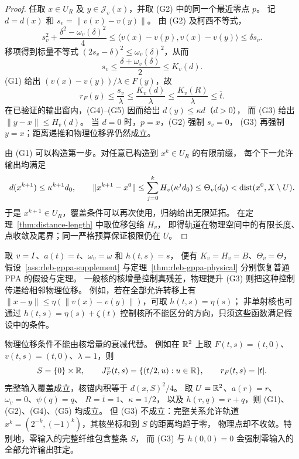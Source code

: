 \begin{proof}
任取 $x\in U_R$ 及 $y\in\mathcal J_v(x)$，并取 (G2) 中的同一个最近零点 $p$。
记 $d=d(x)$ 和 $s_v=\|v(x)-v(y)\|$。
由 (G2) 及柯西不等式，
\[
 s_v^2+\frac{\delta^2-\omega_v(\delta)^2}{4}
 \le\langle v(x)-v(p),v(x)-v(y)\rangle
 \le\delta s_v.
\]
移项得到标量不等式 $(2s_v-\delta)^2\le\omega_v(\delta)^2$，从而
\begin{equation}
\label{eq:gppa-kernel-one-step}
 s_v\le\frac{\delta+\omega_v(\delta)}2\le K_v(d).
\end{equation}
(G1) 给出 $(v(x)-v(y))/\lambda\in F(y)$，故
\[
 r_F(y)\le\frac{s_v}\lambda
 \le\frac{K_v(d)}\lambda\le\frac{K_v(R)}\lambda\le\bar t.
\]
在已验证的输出窗内，(G4)--(G5) 因而给出 $d(y)\le\kappa d$（$d>0$），
而 (G3) 给出 $\|y-x\|\le H_v(d)$。
当 $d=0$ 时，$p=x$，(G2) 强制 $s_v=0$，
(G3) 再强制 $y=x$；距离递推和物理位移界仍然成立。

由 (G1) 可以构造第一步。对任意已构造到 $x^k\in U_R$ 的有限前缀，
每个下一允许输出均满足
\[
 d(x^{k+1})\le\kappa^{k+1}d_0,\qquad
 \|x^{k+1}-x^0\|
 \le\sum_{j=0}^{k}H_v(\kappa^jd_0)
 \le\Theta_v(d_0)<\operatorname{dist}(x^0,X\setminus U).
\]
于是 $x^{k+1}\in U_R$，覆盖条件可以再次使用，归纳给出无限延拓。
在定理~\ref{thm:distance-length} 中取位移包络 $H_v$，
即得轨道在物理空间中的有限长度、点收敛及尾界；同一严格预算保证极限仍在 $U$。
\end{proof}

取 $v=I$、$a(t)=t$、$\omega_v=\omega$ 和 $h(t,s)=s$，
便有 $K_v=H_v=B$、$\Theta_v=\Theta$，
假设~\ref{ass:rleb-gppa-supplement} 与定理~\ref{thm:rleb-gppa-physical}
分别恢复普通 PPA 的假设与定理。
一般核的核增量控制真残差，物理提升 (G3) 则把这种控制传递给相邻物理位移。
例如，若在全部允许转移上有
$\|x-y\|\le\eta(\|v(x)-v(y)\|)$，可取 $h(t,s)=\eta(s)$；
非单射核也可通过 $h(t,s)=\eta(s)+\zeta(t)$
控制核所不能区分的方向，只须这些函数满足假设中的条件。


\begin{remark}[非单射核的纤维方向]
物理位移条件不能由核增量的衰减代替。
例如在 $\mathbb R^2$ 上取 $F(t,s)=(t,0)$、$v(t,s)=(t,0)$、$\lambda=1$，则
\[
 S=\{0\}\times\mathbb R,\qquad
 J^v_F(t,s)=\{(t/2,u):u\in\mathbb R\},\qquad r_F(t,s)=|t|.
\]
完整输入覆盖成立，核锚内积等于 $d(x,S)^2/4$。
取 $U=\mathbb R^2$、$a(r)=r$、$\omega_v=0$、$\psi(q)=q$、
$R=\bar t=1$、$\kappa=1/2$，
以及 $h(r,q)=r+q$，则 (G1)、(G2)、(G4)、(G5) 均成立。
但 (G3) 不成立：完整关系允许轨道
$x^k=(2^{-k},(-1)^k)$，其核坐标和到 $S$ 的距离均趋于零，
物理点却不收敛。特别地，零输入的完整纤维包含整条 $S$，
而 (G3) 与 $h(0,0)=0$ 会强制零输入的全部允许输出驻定。
\end{remark}
